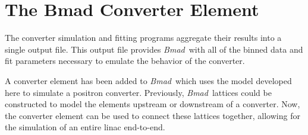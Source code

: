 \documentclass[letter,
               biblatex,     %
               keeplastbox,   %
               ]{jacow}
\newcommand{\bmad}{\textit{Bmad}\xspace}
\begin{document}

%
%


%
%


\section{The Bmad Converter Element}

The converter simulation and fitting programs aggregate their results into a single output file.
This output file provides \bmad \, with all of the binned data and fit parameters necessary to emulate the behavior of the converter.

A converter element has been added to \bmad \, which uses the model developed here to simulate a positron converter.
Previously, \bmad \, lattices could be constructed to model the elements upstream or downstream of a converter.
Now, the converter element can be used to connect these lattices together, allowing for the simulation of an entire linac end-to-end.
\end{document}
